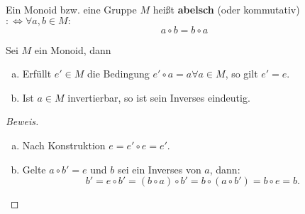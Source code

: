 \documentclass[a4paper]{report}
\begin{document}
\begin{defi} %
Ein Monoid bzw. eine Gruppe $M$ heißt \textbf{abelsch} (oder kommutativ) $:\iff \forall a, b \in M:$ $$a \circ b = b \circ a$$
\end{defi}
\begin{prop}
  Sei $M$ ein Monoid, dann
  \begin{enumerate}[(a)]
    \item Erfüllt $e' \in M$ die Bedingung $e' \circ a = a \forall a \in M$, so gilt $e' = e$.
    \item Ist $a \in M$ invertierbar, so ist sein Inverses eindeutig.
  \end{enumerate}
\end{prop}
\begin{proof}[Beweis] \item
\begin{enumerate}[(a)]
  \item Nach Konstruktion $e = e' \circ e = e'$.
\item Gelte $a \circ b' = e$ und $b$ sei ein Inverses von $a$, dann:
$$b' = e \circ b' = (b \circ a) \circ b' = b \circ (a \circ b') = b \circ e = b. $$
\end{enumerate}
\end{proof}
\end{document}
